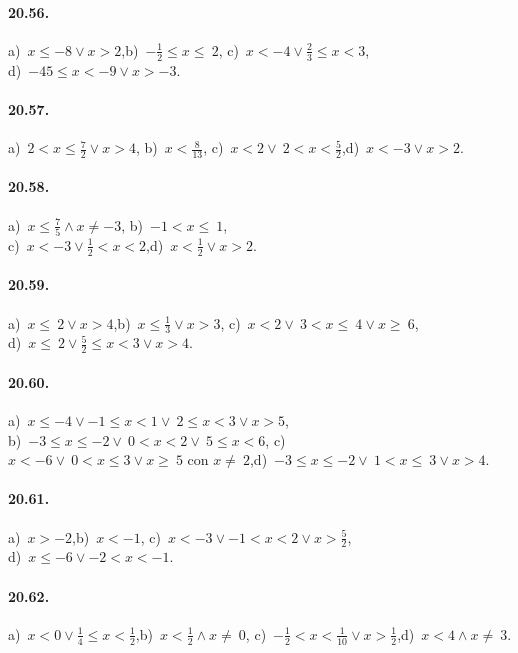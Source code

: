 \paragraph{20.56.} a)~$x\le -8\vee x>2$,\quad b)~$-{\frac{1}{2}}\le x\le~2$,\quad
c)~$x<-4\vee\frac{2}{3}\le x<3$,\quad \protect\\ d)~$-45\le x<-9\vee x>-3$.

\paragraph{20.57.} a)~$2<x\le \frac{7}{2}\vee x>4$,\quad
b)~$x<\frac{8}{13}$,\quad
c)~$x<2\vee~2<x<\frac{5}{2}$,\quad d)~$x<-3\vee x>2$.

\paragraph{20.58.} a)~$x\le \frac{7}{5}\wedge x\neq-3$,\quad
b)~$-1<x\le~1$,\quad
\protect\\ c)~$x<-3\vee\frac{1}{2}<x<2$,\quad d)~$x<\frac{1}{2}\vee x>2$.

\paragraph{20.59.} a)~$x\le~2\vee x>4$,\quad b)~$x\le \frac{1}{3}\vee x>3$,\quad
c)~$x<2\vee~3<x\le~4\vee x\ge~6$,\quad \protect\\ d)~$x\le~2\vee \frac{5}{2}\le x<3\vee x>4$.

\paragraph{20.60.} a)~$x\le -4\vee -1\le x<1\vee~2\le x<3\vee x>5$,\quad
\protect\\ b)~$-3\le x\le -2\vee~0<x<2\vee~5\le x<6$,\quad
c)~$x<-6\vee~0<x\le3\vee x\ge~5\text{ con }x\neq~2$,\quad d)~$-3\le x\le -2\vee~1<x\le~3\vee x>4$.

\paragraph{20.61.} a)~$x>-2$,\quad b)~$x<-1$,\quad
c)~$x<-3\vee -1<x<2\vee x>\frac{5}{2}$,\quad
\protect\\ d)~$x\le -6\vee -2<x<-1$.

\paragraph{20.62.} a)~$x<0\vee\frac{1}{4}\le x<\frac{1}{2}$,\quad b)~$x<\frac{1}{2}\wedge x\neq~0$,\quad
c)~$-\frac{1}{2}<x<\frac{1}{10}\vee x>\frac{1}{2}$,\quad d)~$x<4\wedge x\neq~3$.

